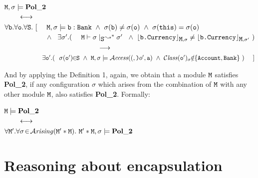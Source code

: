 \documentclass[acmsmall,screen]{acmart}
\begin{document}
 \noindent
 ${\mbox{\tt{M}}}, \sigma \models   {\bf {Pol\_2}}$\\$ \strut \ \ \ \  \ \  \longleftrightarrow $\\
 $\forall \prg{b}.\forall \prg{o}.\forall \prg{S}.\ [ \ \ \ \ \M, \sigma \models \prg{b}:\prg{Bank}\ \wedge\  
 \sigma(\prg{b})\neq \sigma(\prg{o})\ \wedge \ 
 \sigma(\prg{this}) = \sigma(\prg{o}) $\\
 $\strut \hspace{2.1cm}  \wedge \
 \ \exists\sigma'.(\ \ \ \ {\mbox{\tt{M}}} \vdash \sigma\mid_{{\mbox{\tt{S}}}}  \leadsto^* \sigma'\
\ \wedge\ {\lfloor{ {{\mbox{\tt{b.Currency}}}}}\rfloor_{{\mbox{\tt{M}}},\sigma}}\neq {\ensuremath{\lfloor{ {{\mbox{\tt{b.Currency}}}}}\rfloor_{{\mbox{\tt{M}}},\sigma'}}}\ )$\\
$\strut \hspace{4.7cm} \longrightarrow$ \\
 $\strut \hspace{2.1cm}  \exists \prg{o}'. (\ \  \sigma(\prg{o}')
\!\!\in\!\!\prg{S}\ \wedge \ \M, \sigma \models \CanAccess( \prg{o}', \prg{a} )\ \wedge \  \ClassOf{\prg{o}'}{\sigma}\!\!\notin\!\!\{ \prg{Account}, \prg{Bank}\}    \ )  \ \ \ \  ]$
 
\vspace{.1in}  
And by applying the Definition 1, again, we obtain that a module ${\mbox{\tt{M}}}$ satisfies {\bf {Pol\_2}}, if any configuration $\sigma$ which arises 
from the combination of ${\mbox{\tt{M}}}$ with any other module ${\mbox{\tt{M}}}$, also satisfies {\bf {Pol\_2}}. Formally:

\noindent
${\mbox{\tt{M}}}  \models   {\bf {Pol\_2}}$\\$ \strut \ \ \ \  \ \  \longleftrightarrow $\\
 $  \forall {\mbox{\tt{M}}}'. \forall \sigma\!\in\!{\mathcal{A}}\textrm{\textit{rising}}({\mbox{\tt{M}}}'*{\mbox{\tt{M}}}).\ {\mbox{\tt{M}}}'*{\mbox{\tt{M}}},\sigma \models  {\bf {Pol\_2}}$
 
 

\section{Reasoning about encapsulation}
\end{document}
